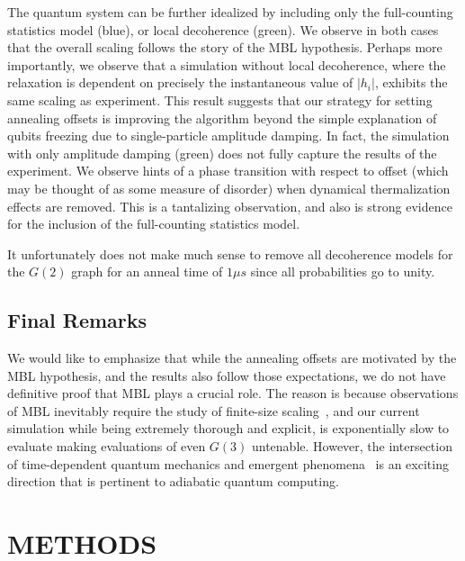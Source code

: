 \documentclass[prd,twocolumn,tightenlines,preprintnumbers,showpacs,superscriptaddress,notitlepage,nofootinbib,eqsecnum,floatfix,longbibliography,aps,10pt]{revtex4-2}
\begin{document}
The quantum system can be further idealized by including only the full-counting statistics model (blue), or local decoherence (green). We observe in both cases that the overall scaling follows the story of the MBL hypothesis. Perhaps more importantly, we observe that a simulation without local decoherence, where the relaxation is dependent on precisely the instantaneous value of $|h_i|$, exhibits the same scaling as experiment. This result suggests that our strategy for setting annealing offsets is improving the algorithm beyond the simple explanation of qubits freezing due to single-particle amplitude damping. In fact, the simulation with only amplitude damping (green) does not fully capture the results of the experiment. We observe hints of a phase transition with respect to offset (which may be thought of as some measure of disorder) when dynamical thermalization effects are removed. This is a tantalizing observation, and also is strong evidence for the inclusion of the full-counting statistics model.

It unfortunately does not make much sense to remove all decoherence models for the $G(2)$ graph for an anneal time of $1\mu s$ since all probabilities go to unity.

\subsection{Final Remarks}
\label{sec:results:final}
We would like to emphasize that while the annealing offsets are motivated by the MBL hypothesis, and the results also follow those expectations, we do not have definitive proof that MBL plays a crucial role.
The reason is because observations of MBL inevitably require the study of finite-size scaling~\cite{2015PhRvB..91h1103L}, and our current simulation while being extremely thorough and explicit, is exponentially slow to evaluate making evaluations of even $G(3)$ untenable.
However, the intersection of time-dependent quantum mechanics and emergent phenomena~\cite{Goldenfeld:1992qy} is an exciting direction that is pertinent to adiabatic quantum computing.


\section{METHODS}
\label{sec:methods}
\end{document}
